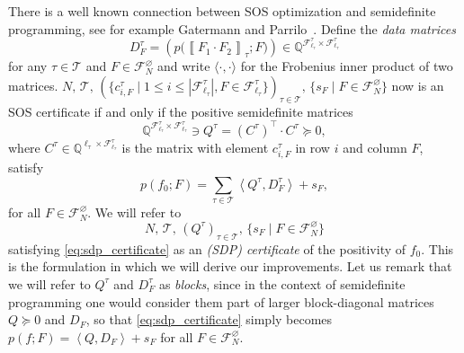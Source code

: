 \documentclass[a4paper,11pt]{article}
\numberwithin{equation}{section}
\newcommand{\mF}{\mathcal{F}}
\newcommand{\mT}{\mathcal{T}}
\newcommand{\QQ}{\mathbb{Q}}
\begin{document}
There is a well known connection between SOS optimization and semidefinite programming, see for example Gatermann and Parrilo~\cite{gatermann2004symmetry}. Define the \emph{data matrices}
%
\begin{equation*}\label{eq:density_matrix}
    D_F^\tau = \left( p \big( \left\llbracket F_1 \cdot F_2 \right\rrbracket_\tau; F \big) \right) \in \QQ^{\mF^\tau_{\ell_\tau} \times \mF^\tau_{\ell_\tau}}
\end{equation*}
%
for any $\tau \in \mT$ and $F \in \mF^\varnothing_N$ and write $\langle \cdot, \cdot \rangle$ for the Frobenius inner product of two matrices. $N, \, \mT, \, (\{c_{i, F}^\tau \mid 1 \leq i \leq | \mF^\tau_{\ell_\tau}|, F \in \mF^\tau_{\ell_\tau} \} )_{\tau \in \mT}, \, \{ s_F \mid F \in \mF_N^\varnothing \}$ now is an SOS certificate if and only if the positive semidefinite matrices
%
\begin{equation*}
    \QQ^{\mF^\tau_{\ell_\tau} \times \mF^\tau_{\ell_\tau}} \ni Q^\tau = (C^\tau)^\top \cdot C^\tau  \succeq 0,
\end{equation*}
%
where $C^\tau \in \QQ^{\ell_\tau \times \mF^\tau_{\ell_\tau}}$ is the matrix with element $c_{i,F}^\tau$ in row $i$ and column $F$, satisfy
%
\begin{equation} \label{eq:sdp_certificate}
    p(f_0;F)  = \sum_{\tau \in \mT} \left\langle Q^\tau, D_F^\tau \right\rangle + s_F,
\end{equation}
%
for all $F \in \mF^\varnothing_N$. We will refer to
%
\begin{equation*}
    N, \, \mT, \, (Q^\tau )_{\tau \in \mT}, \, \{ s_F \mid F \in \mF_N^\varnothing \}
\end{equation*}
%
satisfying \cref{eq:sdp_certificate} as an \emph{(SDP) certificate} of the positivity of $f_0$. This is the formulation in which we will derive our improvements. Let us remark that we will refer to $Q^\tau$ and $D_F^\tau$ as \emph{blocks}, since in the context of semidefinite programming one would consider them part of larger block-diagonal matrices $Q \succeq 0$ and $D_F$, so that \cref{eq:sdp_certificate} simply becomes $p(f;F)  = \left\langle Q, D_F \right\rangle + s_F$ for all $F \in \mF^\varnothing_N$.
\end{document}
